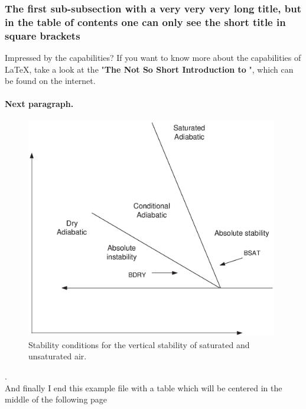        
        \subsubsection[Subsection Short Title]{The first sub-subsection with a very very very long title, but in the table of contents one can only see the short title in square brackets}

                Impressed by the capabilities? 
                If you want to know more about the capabilities of \LaTeX, take a look at the "\textbf{The Not So Short Introduction to \LaTeXe}", which can be found on the internet.

    \paragraph{Next paragraph.}
    \begin{figure}[htbp]  %
    \centering
    \includegraphics[width=11cm]{vertstab.eps}
    \caption{Stability conditions for the vertical stability of saturated and unsaturated air.} %
    \label{f:verticalstab}
    \end{figure}
.\\    
And finally I end this example file with a table which will be centered in the middle of the following page
